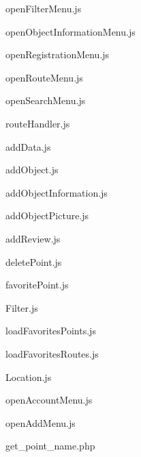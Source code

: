 
openFilterMenu.js


openObjectInformationMenu.js


openRegistrationMenu.js


openRouteMenu.js


openSearchMenu.js


routeHandler.js


addData.js


addObject.js


addObjectInformation.js


addObjectPicture.js


addReview.js


deletePoint.js


favoritePoint.js


Filter.js


loadFavoritesPoints.js


loadFavoritesRoutes.js


Location.js


openAccountMenu.js


openAddMenu.js


get\_point\_name.php


